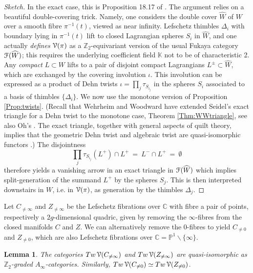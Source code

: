 \documentclass[reqno,10pt]{amsart}
\numberwithin{equation}{section}
\newcommand{\bC}{{\mathbb C}}
\newcommand{\bK}{{\mathbb K}}
\newcommand{\bP}{{\mathbb P}}
\newcommand{\bZ}{{\mathbb Z}}
\newcommand{\scrV}{\EuScript{V}}
\newcommand{\scrF}{\EuScript{F}}
\newtheorem{Lemma}[thm]{Lemma}
\theoremstyle{remark}
\begin{document}
\begin{proof}[Sketch]
In the exact case, this is Proposition 18.17 of \cite{FCPLT}.  The argument relies on a beautiful double-covering trick.  Namely, one considers the double cover $\widehat{W}$ of $W$ over a smooth fibre $\pi^{-1}(t)$, viewed as near infinity.  Lefschetz thimbles $\Delta_i$ with boundary lying in $\pi^{-1}(t)$ lift to closed Lagrangian spheres $S_i$ in $\widehat{W}$, and one actually \emph{defines} $\scrV(\pi)$ as a $\bZ_2$-equivariant version of the usual Fukaya category $\scrF(\widehat{W})$; this requires the underlying coefficient field $\bK$ not to be of characteristic 2.  Any \emph{compact} $L\subset W$ lifts to a pair of disjoint compact Lagrangians $L^{\pm} \subset \widehat{W}$, which are exchanged by the covering involution $\iota$. This involution can be expressed as a product of Dehn twists $\iota = \prod_j \tau_{S_{i_j}}$ in the spheres $S_i$ associated to a basis of thimbles $\{\Delta_i\}$.  We now use  the monotone version of Proposition \ref{Prop:twists}.  (Recall that Wehrheim and Woodward have extended Seidel's exact triangle for a Dehn twist to the monotone case, Theorem \ref{Thm:WWtriangle}, see also Oh's  \cite{Oh:triangle}.  The exact triangle, together with general aspects of quilt theory, implies that the geometric Dehn twist and algebraic twist are quasi-isomorphic functors \cite{WW:triangle}.)  The disjointness 
\[
\prod_j \tau_{S_{i_j}}(L^+) \cap L^+ \ = \ L^- \cap L^+ \ = \ \emptyset
\]
therefore yields a vanishing arrow in an exact triangle in $\scrF(\widehat{W})$ which implies split-generation of the summand $L^+$ by the spheres $S_j$.  This is then interpreted downstairs in $W$, i.e. in $\scrV(\pi)$, as generation by the thimbles $\Delta_j$. 
\end{proof}

  Let  $C_{\neq\infty}$ and $Z_{\neq\infty}$ be the Lefschetz fibrations over $\bC$ with fibre a pair of points, respectively a $2g$-dimensional quadric, given by removing the $\infty$-fibres from the closed manifolds $C$ and $Z$.  We can alternatively remove the 0-fibres to yield $C_{\neq 0}$ and $Z_{\neq 0}$, which are also Lefschetz fibrations over $\bC = \bP^1\backslash \{\infty\}$.

\begin{Lemma}\label{Lem:thimblesagree}
The categories $Tw\,\scrV(C_{\neq\infty})$ and $Tw\,\scrV(Z_{\neq\infty})$ are quasi-isomorphic as $\bZ_2$-graded $A_{\infty}$-categories.  Similarly, $Tw\,\scrV(C_{\neq 0}) \simeq Tw\,\scrV(Z_{\neq 0})$.
\end{Lemma}
\end{document}
